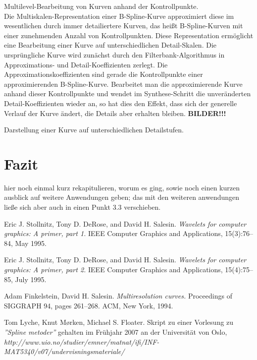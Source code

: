 \documentclass{article}
\begin{document}
Multilevel-Bearbeitung von Kurven anhand der Kontrollpunkte.\\
Die Multiskalen-Representation einer B-Spline-Kurve approximiert diese im wesentlichen durch immer detailiertere Kurven, das heißt B-Spline-Kurven mit einer zunehmenden Anzahl von Kontrollpunkten. Diese Representation ermöglicht eine Bearbeitung einer Kurve auf unterschiedlichen Detail-Skalen. Die ursprüngliche Kurve wird zunächst durch den Filterbank-Algorithmus in Approximations- und Detail-Koeffizienten zerlegt. Die Approximationskoeffizienten sind gerade die Kontrollpunkte einer approximierenden B-Spline-Kurve. Bearbeitet man die approximierende Kurve anhand dieser Kontrollpunkte und wendet im Synthese-Schritt die unveränderten Detail-Koeffizienten wieder an, so hat dies den Effekt, dass sich der generelle Verlauf der Kurve ändert, die Details aber erhalten bleiben. \textbf{BILDER!!!}

Darstellung einer Kurve auf unterschiedlichen Detailstufen.



\section{Fazit}

hier noch einmal kurz rekapitulieren, worum es ging, sowie noch einen kurzen ausblick auf weitere Anwendungen geben; das mit den weiteren anwendungen ließe sich aber auch in einen Punkt 3.3 verschieben.





\begin{thebibliography}{9}

Eric J. Stollnitz, Tony D. DeRose, and David H. Salesin.
\textit{Wavelets for computer graphics: A primer, part 1.}
IEEE Computer Graphics and Applications, 15(3):76–84,
May 1995.

Eric J. Stollnitz, Tony D. DeRose, and David H. Salesin.
\textit{Wavelets for computer graphics: A primer, part 2.}
IEEE Computer Graphics and Applications, 15(4):75–85,
July 1995.

Adam Finkelstein, David H. Salesin.
\textit{Multiresolution curves.}
Proceedings of SIGGRAPH 94, pages 261–268.
ACM, New York, 1994.

Tom Lyche, Knut Mørken, Michael S. Floater.
Skript zu einer Vorlesung zu \textit{''Spline metoder''} gehalten im Frühjahr 2007 an der Universität von Oslo,
\textit{http://www.uio.no/studier/emner/matnat/ifi/INF-MAT5340/v07/undervisningsmateriale/}

\end{thebibliography}
\end{document}

